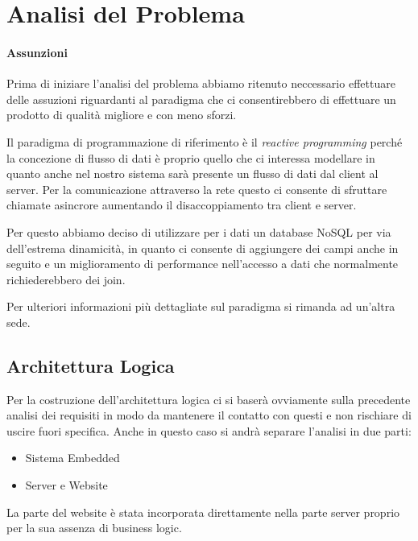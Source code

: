 \section{Analisi del Problema}

\paragraph{Assunzioni}
Prima di iniziare l'analisi del problema abbiamo ritenuto neccessario effettuare delle assuzioni riguardanti al paradigma che ci consentirebbero di effettuare un prodotto di qualit\`a migliore e con meno sforzi.

Il paradigma di programmazione di riferimento \`e il \textit{reactive programming} perch\'e la concezione di flusso di dati \`e proprio quello che ci interessa modellare in quanto anche nel nostro sistema sar\`a presente un flusso di dati dal client al server. Per la comunicazione attraverso la rete questo ci consente di sfruttare chiamate asincrore aumentando il disaccoppiamento tra client e server.

Per questo abbiamo deciso di utilizzare per i dati un database NoSQL per via dell'estrema dinamicit\`a, in quanto ci consente di aggiungere dei campi anche in seguito e un miglioramento di performance nell'accesso a dati che normalmente richiederebbero dei join.

Per ulteriori informazioni pi\`u dettagliate sul paradigma si rimanda ad un'altra sede. 

\subsection{Architettura Logica}

Per la costruzione dell'architettura logica ci si baser\`a ovviamente sulla precedente analisi dei requisiti in modo da mantenere il contatto con questi e non rischiare di uscire fuori specifica. Anche in questo caso si andr\`a separare l'analisi in due parti:

\begin{itemize}
\item Sistema Embedded
\item Server e Website
\end{itemize}

La parte del website \`e stata incorporata direttamente nella parte server proprio per la sua assenza di business logic.

